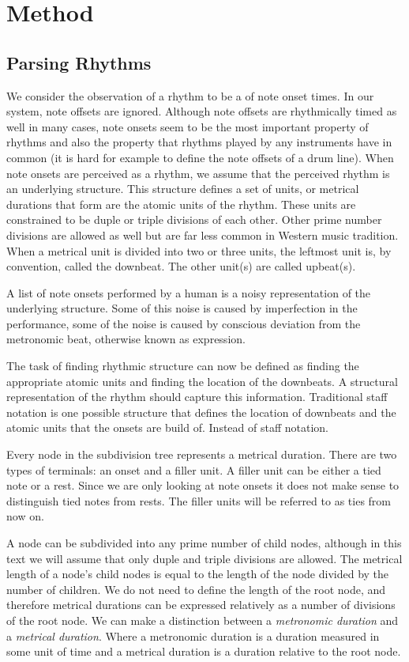 \section{Method}
\label{sec:method}


\subsection{Parsing Rhythms}

We consider the observation of a rhythm to be a of note onset times. In our system, note offsets are ignored. Although note offsets are rhythmically timed as well in many cases, note onsets seem to be the most important property of rhythms and also the property that rhythms played by any instruments have in common (it is hard for example to define the note offsets of a drum line). When note onsets are perceived as a rhythm, we assume that the perceived rhythm is an underlying structure. This structure defines a set of units, or metrical durations that form are the atomic units of the rhythm. These units are constrained to be duple or triple divisions of each other. Other prime number divisions are allowed as well but are far less common in Western music tradition. When a metrical unit is divided into two or three units, the leftmost unit is, by convention, called the downbeat. The other unit(s) are called upbeat(s).

A list of note onsets performed by a human is a noisy representation of the underlying structure. Some of this noise is caused by imperfection in the performance, some of the noise is caused by conscious deviation from the metronomic beat, otherwise known as expression.

The task of finding rhythmic structure can now be defined as finding the appropriate atomic units and finding the location of the downbeats. A structural representation of the rhythm should capture this information. Traditional staff notation is one possible structure that defines the location of downbeats and the atomic units that the onsets are build of. Instead of staff notation.

Every node in the subdivision tree represents a metrical duration. There are two types of terminals: an onset and a filler unit. A filler unit can be either a tied note or a rest. Since we are only looking at note onsets it does not make sense to distinguish tied notes from rests. The filler units will be referred to as ties from now on.

A node can be subdivided into any prime number of child nodes, although in this text we will assume that only duple and triple divisions are allowed. The metrical length of a node's child nodes is equal to the length of the node divided by the number of children. We do not need to define the length of the root node, and therefore metrical durations can be expressed relatively as a number of divisions of the root node. We can make a distinction between a \textit{metronomic duration} and a \textit{metrical duration}. Where a metronomic duration is a duration measured in some unit of time and a metrical duration is a duration relative to the root node. 


